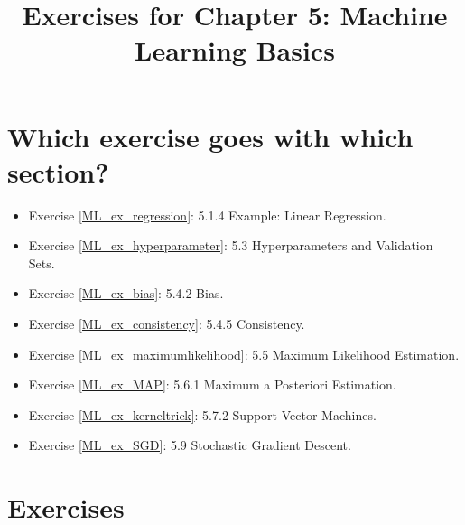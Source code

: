 \documentclass{article}
\title{Exercises for Chapter 5: Machine Learning Basics}
\begin{document}
\maketitle

\section*{Which exercise goes with which section?}
\begin{itemize}
    \item Exercise \ref{ML_ex_regression}: 5.1.4 Example: Linear Regression.
    \item Exercise \ref{ML_ex_hyperparameter}: 5.3 Hyperparameters and Validation Sets.
    \item Exercise \ref{ML_ex_bias}: 5.4.2 Bias.
    \item Exercise \ref{ML_ex_consistency}: 5.4.5 Consistency.
    \item Exercise \ref{ML_ex_maximumlikelihood}: 5.5 Maximum Likelihood Estimation.
    \item Exercise \ref{ML_ex_MAP}: 5.6.1 Maximum a Posteriori Estimation.
    \item Exercise \ref{ML_ex_kerneltrick}: 5.7.2 Support Vector Machines.
    \item Exercise \ref{ML_ex_SGD}: 5.9 Stochastic Gradient Descent.
\end{itemize}

\section*{Exercises}
\end{document}
